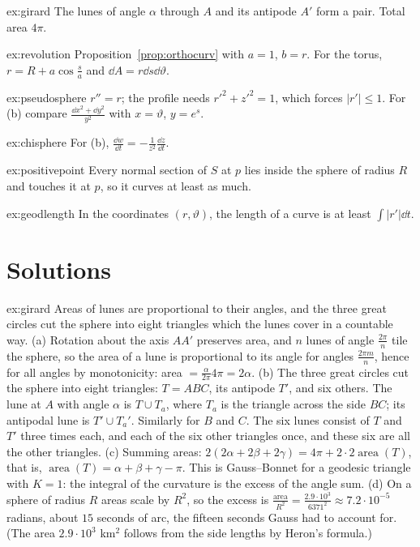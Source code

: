 \begin{hint}{ex:girard}
The lunes of angle $\alpha$ through $A$ and its antipode $A'$ form a pair. Total area $4\pi$.
\end{hint}
\begin{hint}{ex:revolution}
Proposition~\ref{prop:orthocurv} with $a=1$, $b=r$. For the torus, $r=R+a\cos\frac sa$ and $\dd A=r\dd s\dd\vartheta$.
\end{hint}
\begin{hint}{ex:pseudosphere}
$r''=r$; the profile needs $r'^2+z'^2=1$, which forces $|r'|\le1$. For (b) compare $\frac{\dd x^2+\dd y^2}{y^2}$ with $x=\vartheta$, $y=e^s$.
\end{hint}
\begin{hint}{ex:chisphere}
For (b), $\frac{\dd w}{\dd t}=-\frac1{z^2}\frac{\dd z}{\dd t}$.
\end{hint}
\begin{hint}{ex:positivepoint}
Every normal section of $S$ at $p$ lies inside the sphere of radius $R$ and touches it at $p$, so it curves at least as much.
\end{hint}
\begin{hint}{ex:geodlength}
In the coordinates $(r,\vartheta)$, the length of a curve is at least $\int|r'|\dd t$.
\end{hint}

\section{Solutions}

\begin{solution}{ex:girard}
\idea Areas of lunes are proportional to their angles, and the three great circles cut the sphere into eight triangles which the lunes cover in a countable way.
\writeup (a) Rotation about the axis $AA'$ preserves area, and $n$ lunes of angle $\frac{2\pi}n$ tile the sphere, so the area of a lune is proportional to its angle for angles
$\frac{2\pi m}n$, hence for all angles by monotonicity: area $=\frac\alpha{2\pi}4\pi=2\alpha$. (b) The three great circles cut the sphere into eight triangles: $T=ABC$, its antipode
$T'$, and six others. The lune at $A$ with angle $\alpha$ is $T\cup T_a$, where $T_a$ is the triangle across the side $BC$; its antipodal lune is $T'\cup T_a'$. Similarly for $B$ and $C$.
The six lunes consist of $T$ and $T'$ three times each, and each of the six other triangles once, and these six are all the other triangles. (c) Summing areas:
$2(2\alpha+2\beta+2\gamma)=4\pi+2\cdot2\operatorname{area}(T)$, that is, $\operatorname{area}(T)=\alpha+\beta+\gamma-\pi$. This is Gauss--Bonnet for a geodesic triangle with $K=1$: the integral of the curvature
is the excess of the angle sum. (d) On a sphere of radius $R$ areas scale by $R^2$, so the excess is $\frac{\text{area}}{R^2}=\frac{2.9\cdot10^3}{6371^2}\approx7.2\cdot10^{-5}$ radians, about
$15$ seconds of arc, the fifteen seconds Gauss had to account for. (The area $2.9\cdot10^3$ km$^2$ follows from the side lengths by Heron's formula.)
\end{solution}

